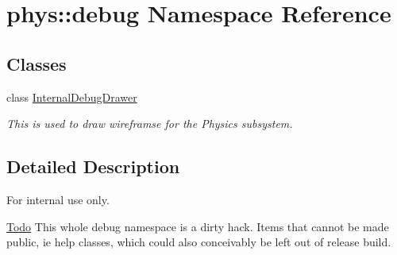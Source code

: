 \hypertarget{namespacephys_1_1debug}{
\section{phys::debug Namespace Reference}
\label{d0/d53/namespacephys_1_1debug}
}
\subsection*{Classes}
\begin{DoxyCompactItemize}
\item 
class \hyperlink{classphys_1_1debug_1_1InternalDebugDrawer}{InternalDebugDrawer}
\begin{DoxyCompactList}\small\item\em This is used to draw wireframse for the Physics subsystem. \item\end{DoxyCompactList}\end{DoxyCompactItemize}


\subsection{Detailed Description}
\begin{DoxyInternal}{For internal use only.}
\begin{Desc}
\item[\hyperlink{todo__todo000013}{Todo}]This whole debug namespace is a dirty hack. Items that cannot be made public, ie help classes, which could also conceivably be left out of release build. \end{Desc}
\end{DoxyInternal}

